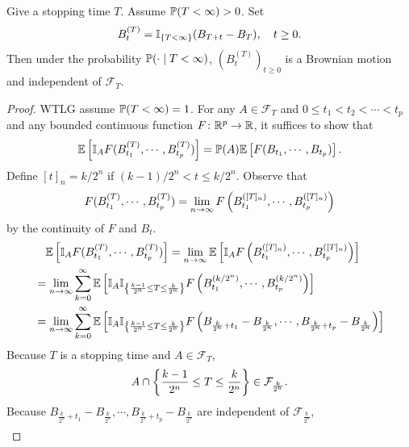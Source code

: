\begin{thm}
    Give a stopping time $T$. Assume $\mathbb{P}(T < \infty) > 0$. Set
    \begin{equation*}
        B^{(T)}_t = \mathbb{I}_{\left\{T< \infty\right\}} (B_{T+t} - B_T),\quad t\geq 0.
    \end{equation*}
    Then under the probability $\mathbb{P}(\cdot \mid T < \infty)$, $(B^{(T)}_t)_{t \geq 0}$ is a Brownian motion and independent of $\mathcal{F}_T$.
\end{thm}
\begin{proof}
    WTLG assume $\mathbb{P}(T < \infty) = 1$. For any $A \in \mathcal{F}_T$ and $0 \leq t_1 < t_2 < \cdots < t_p$ and any bounded continuous function $F \colon \mathbb{R}^p \rightarrow \mathbb{R}$, it suffices to show that 
    \begin{equation*}
        \mathbb{E}\left[\mathbb{I}_A F(B^{(T)}_{t_1},\cdots,B^{(T)}_{t_p})\right] = \mathbb{P}(A)\mathbb{E}\left[F(B_{t_1},\cdots,B_{t_p})\right].
    \end{equation*}
    Define $[t]_n = k / 2^n$ if $(k-1) / 2^n < t \leq k / 2^n$. Observe that
    \begin{equation*}
        F(B^{(T)}_{t_1},\cdots,B^{(T)}_{t_p}) = \lim_{n\rightarrow\infty} F\left(B^{([T]_n)}_{t_1},\cdots,B^{([T]_n)}_{t_p}\right)
    \end{equation*}
    by the continuity of $F$ and $B_t$.
    \begin{align*}
        &\quad\mathbb{E}\left[\mathbb{I}_A F(B^{(T)}_{t_1},\cdots,B^{(T)}_{t_p})\right] = \lim_{n\rightarrow \infty} \mathbb{E}\left[\mathbb{I}_AF\left(B^{([T]_n)}_{t_1},\cdots,B^{([T]_n)}_{t_p}\right)\right] \\
        &= \lim_{n\rightarrow \infty} \sum_{k=0}^\infty \mathbb{E}\left[\mathbb{I}_A\mathbb{I}_{\left\{ \frac{k-1}{2^n}\leq T \leq \frac{k}{2^n} \right\}} F\left( B^{(k/2^n)}_{t_1},\cdots,B^{(k/2^n)}_{t_p} \right)\right] \\
        &= \lim_{n\rightarrow \infty} \sum_{k=0}^\infty \mathbb{E}\left[\mathbb{I}_A\mathbb{I}_{\left\{ \frac{k-1}{2^n}\leq T \leq \frac{k}{2^n} \right\}} F\left(B_{\frac{k}{2^n}+t_1} - B_{\frac{k}{2^n}},\cdots,B_{\frac{k}{2^n}+t_p}-B_{\frac{k}{2^n}} \right)\right]
    \end{align*}
    Because $T$ is a stopping time and $A \in \mathcal{F}_T$,
    \begin{equation*}
        A \cap \left\{ \frac{k-1}{2^n} \leq T \leq \frac{k}{2^n} \right\} \in \mathcal{F}_{\frac{k}{2^n}}.
    \end{equation*}
    Because $B_{\frac{k}{2^n}+t_1} - B_{\frac{k}{2^n}},\cdots,B_{\frac{k}{2^n}+t_p}-B_{\frac{k}{2^n}}$ are independent of $\mathcal{F}_{\frac{k}{2^n}}$,
    \begin{align*}

\end{align*}
\end{proof}
